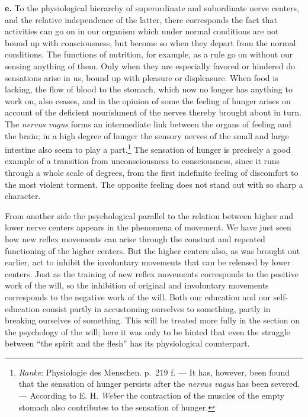 \documentclass[12pt,a4paper]{book}
\newcommand{\opage}[1]{\marginnote{\footnotesize\textit{[#1]}}}
\begin{document}
\textbf{e.} To the physiological hierarchy of superordinate and
subordinate nerve centers, and the relative independence of the latter,
there corresponds the fact that activities can go on in our organism
which under normal conditions are not bound up with consciousness, but
become so when they depart from the normal conditions. The functions of
nutrition, for example, as a rule go on without our sensing
\opage{63}anything of them. Only when they are especially favored or
hindered do sensations arise in us, bound up with pleasure or
displeasure. When food is lacking, the flow of blood to the stomach,
which now no longer has anything to work on, also ceases, and in the
opinion of some the feeling of hunger arises on account of the
deficient nourishment of the nerves thereby brought about in turn. The
\textit{nervus vagus} forms an intermediate link between the organs of
feeling and the brain; in a high degree of hunger the sensory nerves of
the small and large intestine also seem to play a
part.\footnote{\emph{Ranke}: Physiologie des Menschen. p.~219 f. --- It
has, however, been found that the sensation of hunger persists after the
\textit{nervus vagus} has been severed. --- According to E. H.
\emph{Weber} the contraction of the muscles of the empty stomach also
contributes to the sensation of hunger.} The sensation of hunger is
precisely a good example of a transition from unconsciousness to
consciousness, since it runs through a whole scale of degrees, from the
first indefinite feeling of discomfort to the most violent torment. The
opposite feeling does not stand out with so sharp a character.

From another side the psychological parallel to the relation between
higher and lower nerve centers appears in the phenomena of movement. We
have just seen how new reflex movements can arise through the constant
and repeated functioning of the higher centers. But the higher centers
also, as was brought out earlier, act to inhibit the involuntary
movements that can be released by lower centers. Just as the training of
new reflex movements corresponds to the positive work of the will, so
the inhibition of original and involuntary movements corresponds to the
negative work of the will. Both our education and our self-education
consist partly in accustoming ourselves to something, partly in
breaking ourselves of something. This will be treated more fully in the
section on the psychology of the will; here it was only to be hinted
that even the struggle between ``the spirit and the flesh'' has its
physiological counterpart.
\end{document}
